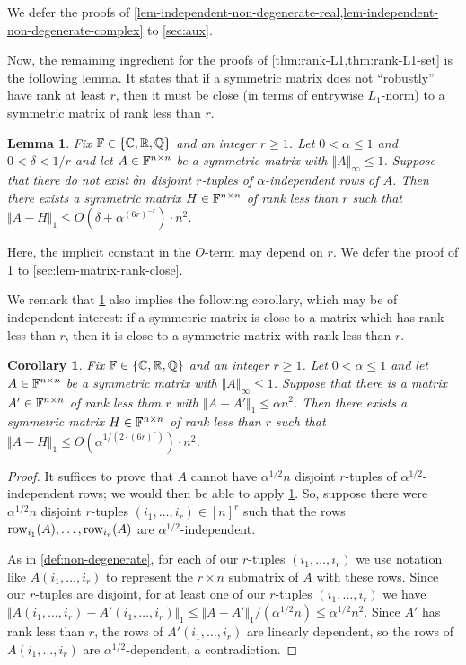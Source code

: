 \documentclass{daj}
\theoremstyle{plain}
\theoremstyle{plain}
\newtheorem{lem}[thm]{Lemma}
\theoremstyle{plain}
\newtheorem{cor}[thm]{Corollary}
\theoremstyle{plain}
\theoremstyle{definition}
\theoremstyle{plain}
\theoremstyle{plain}
\theoremstyle{definition}
\theoremstyle{definition}
\theoremstyle{plain}
\begin{document}
We defer the proofs of \cref{lem-independent-non-degenerate-real,lem-independent-non-degenerate-complex} to \cref{sec:aux}.

Now, the remaining ingredient for the proofs of \cref{thm:rank-L1,thm:rank-L1-set} is the following lemma. It states that if a symmetric matrix does not ``robustly'' have rank at least $r$, then it must be close (in terms of entrywise $L_1$-norm) to a symmetric matrix of rank less than $r$.

\begin{lem}\label{lem-matrix-rank-close}
Fix $\mathbb{F}\in \lbrace \mathbb{C},\mathbb{R}, \mathbb{Q}\rbrace$ and an integer $r\geq 1$. Let $0<\alpha\leq 1$ and $0<\delta<1/r$ and let $A\in \mathbb{F}^{n\times n}$ be a symmetric matrix with $\Vert A\Vert_\infty\le 1$. Suppose that there do not exist $\delta n$ disjoint $r$-tuples of $\alpha$-independent rows of $A$. Then there exists a symmetric matrix $H\in \mathbb{F}^{n\times n}$ of rank less than $r$ such that $\Vert A-H\Vert_1\leq O(\delta+\alpha^{(6r)^{-r}})\cdot  n^2$.
\end{lem}

Here, the implicit constant in the $O$-term may depend on $r$. We defer the proof of \cref{lem-matrix-rank-close} to \cref{sec:lem-matrix-rank-close}.

We remark that \cref{lem-matrix-rank-close} also implies the following corollary, which may be of independent interest: if a symmetric matrix is close to a matrix which has rank less than $r$, then it is close to a symmetric matrix with rank less than $r$.

\begin{cor}
\label{cor:symmetric-close}
Fix $\mathbb{F}\in \lbrace \mathbb{C},\mathbb{R}, \mathbb{Q}\rbrace$ and an integer $r\geq 1$. Let $0<\alpha\leq 1$ and let $A\in \mathbb{F}^{n\times n}$ be a symmetric matrix with $\Vert A\Vert_\infty\le 1$. Suppose that there is a matrix $A'\in \mathbb{F}^{n\times n}$ of rank less than $r$ with $\Vert A-A'\Vert_1\leq \alpha n^2$. Then there exists a symmetric matrix $H\in \mathbb{F}^{n\times n}$ of rank less than $r$ such that $\Vert A-H\Vert_1\leq O(\alpha^{1/(2\cdot (6r)^{r})})\cdot n^2$.
\end{cor}

\begin{proof}
It suffices to prove that $A$ cannot have $\alpha^{1/2} n$ disjoint $r$-tuples of $\alpha^{1/2}$-independent rows; we would then be able to apply \cref{lem-matrix-rank-close}. So, suppose there were $\alpha^{1/2} n$ disjoint $r$-tuples $(i_1,\dots,i_r)\in [n]^r$ such that the rows $\operatorname{row}_{i_1}(A),\dots, \operatorname{row}_{i_r}(A)$ are $\alpha^{1/2}$-independent.

As in \cref{def:non-degenerate}, for each of our $r$-tuples $(i_1,\dots,i_r)$ we use notation like $A(i_1,\dots,i_r)$ to represent the $r\times n$ submatrix of $A$ with these rows. Since our $r$-tuples are disjoint, for at least one of our $r$-tuples $(i_1,\dots,i_r)$ we have $\Vert A(i_1,\dots,i_r)-A'(i_1,\dots,i_r)\Vert_1\le \Vert A-A'\Vert_1/(\alpha^{1/2} n)\leq \alpha^{1/2} n^2$. Since $A'$ has rank less than $r$, the rows of $A'(i_1,\dots,i_r)$ are linearly dependent, so the rows of $A(i_1,\dots,i_r)$ are $\alpha^{1/2}$-dependent, a contradiction.
\end{proof}
\end{document}
